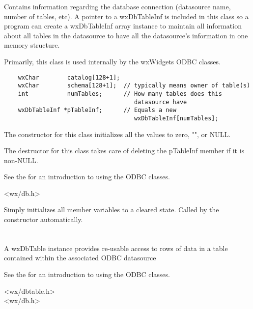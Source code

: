 Contains information regarding the database connection (datasource name,
number of tables, etc).  A pointer to a wxDbTableInf is included in this
class so a program can create a wxDbTableInf array instance to maintain all
information about all tables in the datasource to have all the datasource's
information in one memory structure.

Primarily, this class is used internally by the wxWidgets ODBC classes.

\begin{verbatim}
    wxChar        catalog[128+1];
    wxChar        schema[128+1];  // typically means owner of table(s)
    int           numTables;      // How many tables does this
                                     datasource have
    wxDbTableInf *pTableInf;      // Equals a new
                                     wxDbTableInf[numTables];
\end{verbatim}

The constructor for this class initializes all the values to zero, "", or NULL.

The destructor for this class takes care of deleting the pTableInf member if
it is non-NULL.

See the  for
an introduction to using the ODBC classes.


<wx/db.h>


\label{wxdbinfinitialize}

Simply initializes all member variables to a cleared state.  Called by
the constructor automatically.

\section{}\label{wxdbtable}

A wxDbTable instance provides re-usable access to rows of data in
a table contained within the associated ODBC datasource

See the  for
an introduction to using the ODBC classes.


<wx/dbtable.h>\\
<wx/db.h>


